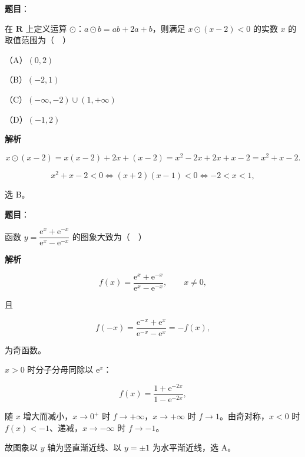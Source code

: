 \begin{answer}

\textbf{题目}：

在 $\mathbf R$ 上定义运算 $\odot$：$a\odot b=ab+2a+b$，则满足 $x\odot(x-2)<0$ 的实数 $x$ 的取值范围为（　）

（A）$(0,2)$

（B）$(-2,1)$

（C）$(-\infty,-2)\cup(1,+\infty)$

（D）$(-1,2)$

\textbf{解析}

\nopagebreak[4]
\[x\odot(x-2)=x(x-2)+2x+(x-2)=x^2-2x+2x+x-2=x^2+x-2 .\]

\nopagebreak[4]
\[x^2+x-2<0\iff (x+2)(x-1)<0\iff -2<x<1,\]

选 B。


\end{answer}
\begin{answer}

\textbf{题目}：

函数 $y=\dfrac{\mathrm e^x+\mathrm e^{-x}}{\mathrm e^x-\mathrm e^{-x}}$ 的图象大致为（　）
\nopagebreak[4]
\begin{center}\end{center}
\nopagebreak[4]
\textbf{解析}

\nopagebreak[4]
\[f(x)=\frac{\mathrm e^x+\mathrm e^{-x}}{\mathrm e^x-\mathrm e^{-x}},\qquad x\neq0,\]

且

\nopagebreak[4]
\[f(-x)=\frac{\mathrm e^{-x}+\mathrm e^{x}}{\mathrm e^{-x}-\mathrm e^{x}}=-f(x),\]

为奇函数。

$x>0$ 时分子分母同除以 $\mathrm e^x$：

\nopagebreak[4]
\[f(x)=\frac{1+\mathrm e^{-2x}}{1-\mathrm e^{-2x}},\]

随 $x$ 增大而减小，$x\to0^+$ 时 $f\to+\infty$，$x\to+\infty$ 时 $f\to1$。由奇对称，$x<0$ 时 $f(x)<-1$、递减，$x\to-\infty$ 时 $f\to-1$。

故图象以 $y$ 轴为竖直渐近线、以 $y=\pm1$ 为水平渐近线，选 A。


\end{answer}
